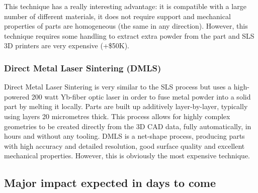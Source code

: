 \begin{figure}[ht]
    \centering
        \hfil
        \hfil
    \caption{}
    \label{fig:SLS_technique}
\end{figure}

This technique has a really interesting advantage: it is compatible with a large number of different materials, it does not require support and mechanical properties of parts are homogeneous (the same in any direction). However, this technique requires some handling to extract extra powder from the part and SLS 3D printers are very expensive (+\$50K).


\subsubsection{Direct Metal Laser Sintering (DMLS)} %

Direct Metal Laser Sintering is very similar to the SLS process but uses a high-powered 200 watt Yb-fiber optic laser in order to fuse metal powder into a solid part by melting it locally. Parts are built up additively layer-by-layer, typically using layers 20 micrometres thick. This process allows for highly complex geometries to be created directly from the 3D CAD data, fully automatically, in hours and without any tooling. DMLS is a net-shape process, producing parts with high accuracy and detailed resolution, good surface quality and excellent mechanical properties. However, this is obviously the most expensive technique.

\begin{figure}[ht]
    \centering
        \hfil
        \hfil
    \caption{}
    \label{fig:DMLS_technique}
\end{figure}


\subsection{Major impact expected in days to come} %

